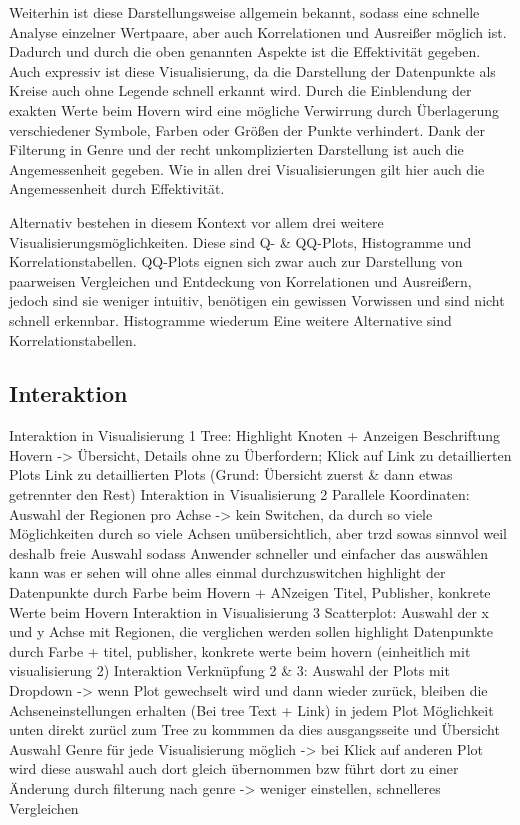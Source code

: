 \documentclass[usegeometry=true]{scrartcl}
\begin{document}
Weiterhin ist diese Darstellungsweise allgemein bekannt, sodass eine schnelle Analyse einzelner Wertpaare, aber auch Korrelationen und Ausreißer möglich ist. 
Dadurch und durch die oben genannten Aspekte ist die Effektivität gegeben. 
Auch expressiv ist diese Visualisierung, da die Darstellung der Datenpunkte als Kreise auch ohne Legende schnell erkannt wird. 
Durch die Einblendung der exakten Werte beim Hovern wird eine mögliche Verwirrung durch Überlagerung verschiedener Symbole, Farben oder Größen der Punkte verhindert. 
Dank der Filterung in Genre und der recht unkomplizierten Darstellung ist auch die Angemessenheit gegeben. 
Wie in allen drei Visualisierungen gilt hier auch die Angemessenheit durch Effektivität. 

Alternativ bestehen in diesem Kontext vor allem drei weitere Visualisierungsmöglichkeiten. 
Diese sind Q- & QQ-Plots, Histogramme und Korrelationstabellen. 
QQ-Plots eignen sich zwar auch zur Darstellung von paarweisen Vergleichen und Entdeckung von Korrelationen und Ausreißern, jedoch sind sie weniger intuitiv, benötigen ein gewissen Vorwissen und sind nicht schnell erkennbar.
Histogramme wiederum 
Eine weitere Alternative sind Korrelationstabellen. 

\subsection{Interaktion}
Interaktion in Visualisierung 1 Tree: Highlight Knoten + Anzeigen Beschriftung Hovern -> Übersicht, Details ohne zu Überfordern; Klick auf Link zu detaillierten Plots
                                        Link zu detaillierten Plots (Grund: Übersicht zuerst & dann etwas getrennter den Rest)
Interaktion in Visualisierung 2 Parallele Koordinaten: Auswahl der Regionen pro Achse -> kein Switchen, da durch so viele Möglichkeiten durch so viele Achsen unübersichtlich, aber trzd sowas sinnvol weil %
                                                        deshalb freie Auswahl sodass Anwender schneller und einfacher das auswählen kann was er sehen will ohne alles einmal durchzuswitchen
                                                        highlight der Datenpunkte durch Farbe beim Hovern + ANzeigen Titel, Publisher, konkrete Werte beim Hovern
Interaktion in Visualisierung 3 Scatterplot: Auswahl der x und y Achse mit Regionen, die verglichen werden sollen
                                            highlight Datenpunkte durch Farbe + titel, publisher, konkrete werte beim hovern (einheitlich mit visualisierung 2)
Interaktion Verknüpfung 2 & 3: Auswahl der Plots mit Dropdown -> wenn Plot gewechselt wird und dann wieder zurück, bleiben die Achseneinstellungen erhalten (Bei tree Text + Link)
                                in jedem Plot Möglichkeit unten direkt zurücl zum Tree zu kommmen da dies ausgangsseite und Übersicht
                                Auswahl Genre für jede Visualisierung möglich -> bei Klick auf anderen Plot wird diese auswahl auch dort gleich übernommen bzw führt dort zu einer Änderung durch filterung nach genre -> weniger einstellen, schnelleres Vergleichen
\end{document}
